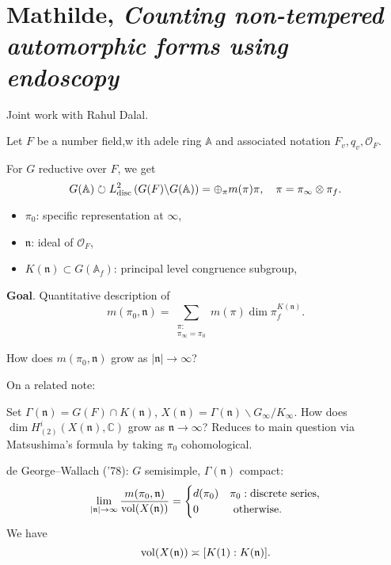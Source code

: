 \documentclass[reqno]{amsart} 
\begin{document}
\section{Mathilde, \emph{Counting non-tempered automorphic forms using endoscopy}}
Joint work with Rahul Dalal.

Let $F$ be a number field,w ith adele ring $\mathbb{A}$ and associated notation $F_v, q_v, \mathcal{O}_F $.

For $G$ reductive over $F$, we get
\begin{equation*}
  G (\mathbb{A} ) \circlearrowright L^2_{\operatorname{disc}} \left( G (F) \backslash G (\mathbb{A} ) \right)
  = \oplus_\pi m (\pi) \pi,
  \quad
  \pi = \pi _\infty \otimes \pi_f.
\end{equation*}

\begin{itemize}
\item $\pi_0$: specific representation at $\infty$,
\item $\mathfrak{n}$: ideal of $\mathcal{O}_F$,
\item $K (\mathfrak{n} ) \subset G (\mathbb{A}_f)$: principal level congruence subgroup,
\end{itemize}
\textbf{Goal}.  Quantitative description of
\begin{equation*}
  m (\pi_0, \mathfrak{n} ) = \sum_{
    \substack{
      \pi :  \\
      \pi _\infty = \pi_0 
    }
  } m (\pi)
  \dim \pi_f^{K (\mathfrak{n} )}.
\end{equation*}
\begin{question}
  How does $m (\pi_0 , \mathfrak{n} ) $ grow as $\lvert \mathfrak{n} \rvert \rightarrow \infty$?
\end{question}
On a related note:
\begin{question}
  Set $\Gamma (\mathfrak{n} ) = G(F) \cap K(\mathfrak{n})$, $X (\mathfrak{n} ) = \Gamma (\mathfrak{n} ) \backslash G _\infty / K _\infty$.  How does $\dim H_{(2)}^i (X (\mathfrak{n}), \mathbb{C} )$ grow as $\mathfrak{n} \rightarrow \infty$?  Reduces to main question via Matsushima's formula by taking $\pi_0$ cohomological.
\end{question}

de George--Wallach ('78): $G$ semisimple, $\Gamma (\mathfrak{n} )$ compact:
\begin{equation*}
  \lim_{\lvert \mathfrak{n}  \rvert \rightarrow \infty }
  \frac{m (\pi_0, \mathfrak{n} )}{\operatorname{vol} (X (\mathfrak{n} ))}
  =
  \begin{cases}
    d (\pi_0 ) & \pi_0 : \text{discrete series}, \\
    0 & \text{ otherwise.}
  \end{cases}
\end{equation*}
We have
\begin{equation*}
\operatorname{vol} (X (\mathfrak{n} )) \asymp [K (1) : K (\mathfrak{n} )].
\end{equation*}
\end{document}
